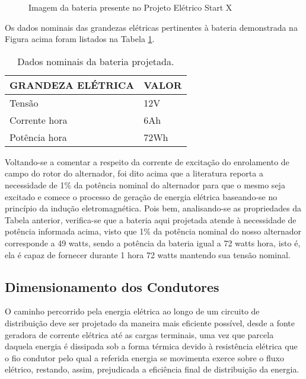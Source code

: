 \begin{figure}[h]
	\centering
	\caption{Imagem da bateria presente no Projeto Elétrico Start X}
	\label{bateria}
\end{figure}

Os dados nominais das grandezas elétricas pertinentes à bateria demonstrada na Figura acima foram listados na Tabela \ref{dados-bateria}.


\begin{table}[h]
\centering
\begin{tabular}{|l|l|}
\hline
\rowcolor[HTML]{329A9D} 
GRANDEZA ELÉTRICA                                                    & VALOR                                                   \\ \hline
Tensão& 12V 
\\ \hline
Corrente hora & 6Ah
\\ \hline
Potência hora  & 72Wh
\\ \hline
\end{tabular}
\caption{Dados nominais da bateria projetada.}
\label{dados-bateria}
\end{table}

Voltando-se a comentar a respeito da corrente de excitação do enrolamento de campo do rotor do alternador, foi dito acima que a literatura reporta a necessidade de 1\% da potência nominal do alternador para que o mesmo seja excitado e comece o processo de geração de energia elétrica baseando-se no princípio da indução eletromagnética. Pois bem, analisando-se as propriedades da Tabela anterior, verifica-se que a bateria aqui projetada atende à necessidade de potência informada acima, visto que 1\% da potência nominal do nosso alternador corresponde a 49 watts, sendo a potência da bateria igual a 72 watts hora, isto é, ela é capaz de fornecer durante 1 hora 72 watts mantendo sua tensão nominal.

\subsection{Dimensionamento dos Condutores}

O caminho percorrido pela energia elétrica ao longo de um circuito de distribuição deve ser projetado da maneira mais eficiente possível, desde a fonte geradora de corrente elétrica até as cargas terminais, uma vez que parcela daquela energia é dissipada sob a forma térmica devido à resistência elétrica que o fio condutor pelo qual a referida energia se movimenta exerce sobre o fluxo elétrico, restando, assim, prejudicada a eficiência final de distribuição da energia.

